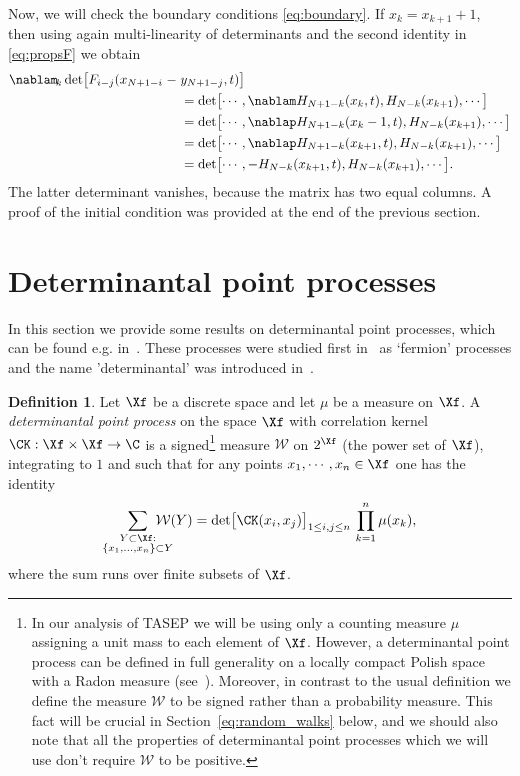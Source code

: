 \documentclass[]{pcmi}
\theoremstyle{plain}
\theoremstyle{definition}
\newtheorem{definition}[equation]{Definition}
\begin{document}
Now, we will check the boundary conditions \eqref{eq:boundary}. If $x_{k} = x_{k+1} + 1$, then using again multi-linearity of determinants and the second identity in \eqref{eq:propsF} we obtain
\begin{align*}
\nablam_{\!k} \det \bigl[F_{i - j}(x_{N+1 - i}\; -\; &y_{N+1 - j},t)\bigr] \\
&= \det \bigl[\cdots, \nablam H_{N+1 - k}(x_{k}, t), H_{N - k}(x_{k+1}), \cdots\bigr]\\
&=  \det \bigl[\cdots, \nablap H_{N+1 - k}(x_{k} - 1, t), H_{N - k}(x_{k+1}), \cdots\bigr]\\
&=  \det \bigl[\cdots, \nablap H_{N+1 - k}(x_{k + 1}, t), H_{N - k}(x_{k+1}), \cdots\bigr]\\
&=  \det \bigl[\cdots, -H_{N - k}(x_{k + 1}, t), H_{N - k}(x_{k+1}), \cdots\bigr].
\end{align*}
The latter determinant vanishes, because the matrix has two equal columns. A proof of the initial condition was provided at the end of the previous section.

\section{Determinantal point processes}

In this section we provide some results on determinantal point processes, which can be found e.g. in~\cite{Bor11,borodinRains,johansson}. These processes were studied first in~\cite{Macchi1975} as `fermion' processes and the name 'determinantal' was introduced in~\cite{borOlsh00}.

\begin{definition}\label{def:DPP}
Let $\Xf$ be a discrete space and let $\mu$ be a measure  on $\Xf$. A \emph{determinantal point process} on the space $\Xf$ with {\rm correlation kernel} $\CK:\Xf\times\Xf\to \C$ is a signed\footnote{ In our analysis of TASEP we will be using only a counting measure $\mu$ assigning a unit mass to each element of $\Xf$. However, a determinantal point process can be defined in full generality on a locally compact Polish space with a Radon measure (see~\cite{BHKPV}). Moreover, in contrast to the usual definition we define the measure $\mathcal{W}$ to be signed rather than a probability measure. This fact will be crucial in Section~\ref{eq:random_walks} below, and we should also note that all the properties of determinantal point processes which we will use don't require $\mathcal{W}$ to be positive.
} measure $\mathcal{W}$ on $2^\Xf$ (the power set of $\Xf$), integrating to $1$ and such that for any points $x_1, \cdots, x_n \in \Xf$ one has the identity
\begin{equation}\label{eq:DPP}
	\sum_{\substack{Y \subset \Xf: \\ \{x_1,\ldots,x_n\}\subset Y}} \hspace{-0.5cm}\mathcal{W}(Y) = \det \bigl[\CK(x_i,x_j)\bigr]_{1 \leq i,j \leq n}\, \prod_{k=1}^n \mu(x_k),
\end{equation}
where the sum runs over finite subsets of $\Xf$.
\end{definition}
\end{document}
